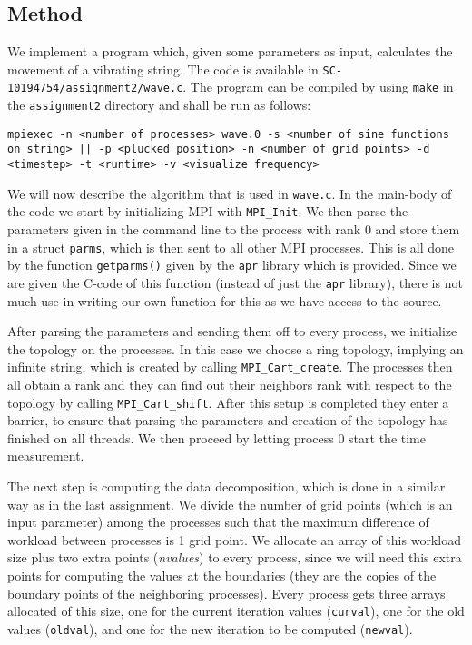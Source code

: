 \documentclass[11pt,a4paper,onecolumn]{article}
\begin{document}
\subsection{Method}
We implement a program which, given some parameters as input, calculates the movement of a vibrating string. The code is available in \texttt{SC-10194754/assignment2/wave.c}. The program can be compiled by using \texttt{make} in the \texttt{assignment2} directory and shall be run as follows:\\
\begin{center}
  \texttt{mpiexec -n <number of processes> wave.0 {-s <number of sine functions on string> || -p <plucked position>} -n <number of grid points> -d <timestep> -t <runtime> -v <visualize frequency>}
\end{center}
We will now describe the algorithm that is used in \texttt{wave.c}. In the main-body of the code we start by initializing MPI with \texttt{MPI\_Init}. We then parse the parameters given in the command line to the process with rank 0 and store them in a struct \texttt{parms}, which is then sent to all other MPI processes. This is all done by the function \texttt{getparms()} given by the \texttt{apr} library which is provided. Since we are given the C-code of this function (instead of just the \texttt{apr} library), there is not much use in writing our own function for this as we have access to the source.

After parsing the parameters and sending them off to every process, we initialize the topology on the processes. In this case we choose a ring topology, implying an infinite string, which is created by calling \texttt{MPI\_Cart\_create}. The processes then all obtain a rank and they can find out their neighbors rank with respect to the topology by calling \texttt{MPI\_Cart\_shift}. After this setup is completed they enter a barrier, to ensure that parsing the parameters and creation of the topology has finished on all threads. We then proceed by letting process 0 start the time measurement.

The next step is computing the data decomposition, which is done in a similar way as in the last assignment. We divide the number of grid points (which is an input parameter) among the processes such that the maximum difference of workload between processes is 1 grid point. We allocate an array of this workload size plus two extra points (\emph{nvalues}) to every process, since we will need this extra points for computing the values at the boundaries (they are the copies of the boundary points of the neighboring processes). Every process gets three arrays allocated of this size, one for the current iteration values (\texttt{curval}), one for the old values (\texttt{oldval}), and one for the new iteration to be computed (\texttt{newval}). 
\end{document}
